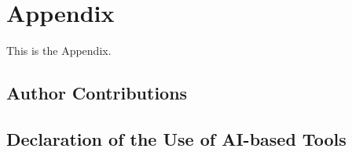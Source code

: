 
\section{Appendix}%
\label{sec:Appendix}%

This is the Appendix.

\subsection{Author Contributions}%

%

\subsection{Declaration of the Use of AI-based Tools}%

%


